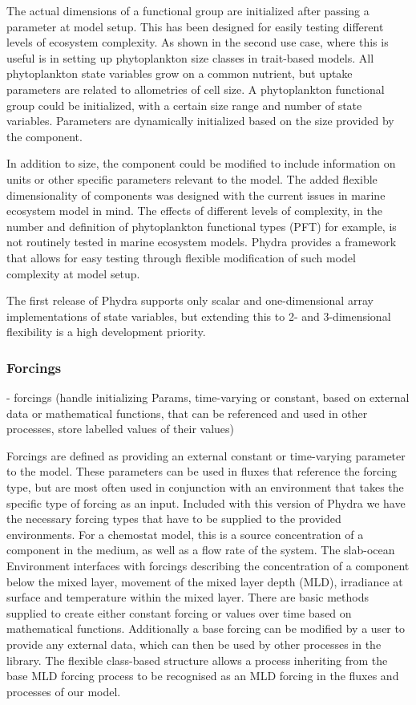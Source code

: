 \documentclass[journal abbreviations, manuscript]{copernicus}
\begin{document}
The actual dimensions of a functional group are initialized after passing a parameter at model setup. This has been designed for easily testing different levels of ecosystem complexity. As shown in the second use case, where this is useful is in setting up phytoplankton size classes in trait-based models. All phytoplankton state variables grow on a common nutrient, but uptake parameters are related to allometries of cell size. A phytoplankton functional group could be initialized, with a certain size range and number of state variables. Parameters are dynamically initialized based on the size provided by the component. 

In addition to size, the component could be modified to include information on units or other specific parameters relevant to the model. The added flexible dimensionality of components was designed with the current issues in marine ecosystem model in mind. The effects of different levels of complexity, in the number and definition of phytoplankton functional types (PFT) for example, is not routinely tested in marine ecosystem models. Phydra provides a framework that allows for easy testing through flexible modification of such model complexity at model setup.

The first release of Phydra supports only scalar and one-dimensional array implementations of state variables, but extending this to 2- and 3-dimensional flexibility is a high development priority. 

\subsubsection{Forcings} \label{Section:ForcingSection}

- forcings (handle initializing Params, time-varying or constant, based on external data or mathematical functions, that can be referenced and used in other processes, store labelled values of their values)

Forcings are defined as providing an external constant or time-varying parameter to the model. These parameters can be used in fluxes that reference the forcing type, but are most often used in conjunction with an environment that takes the specific type of forcing as an input. Included with this version of Phydra we have the necessary forcing types that have to be supplied to the provided environments. For a chemostat model, this is a source concentration of a component in the medium, as well as a flow rate of the system. The slab-ocean Environment interfaces with forcings describing the concentration of a component below the mixed layer, movement of the mixed layer depth (MLD), irradiance at surface and temperature within the mixed layer. There are basic methods supplied to create either constant forcing or values over time based on mathematical functions. Additionally a base forcing can be modified by a user to provide any external data, which can then be used by other processes in the library. The flexible class-based structure allows a process inheriting from the base MLD forcing process to be recognised as an MLD forcing in the fluxes and processes of our model.
\end{document}
